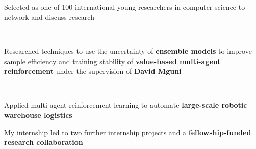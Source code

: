 \documentclass[]{lukas-cv-openfont}
\begin{document}

\noindent
{}
\\
\tinysectionsep

\noindent
{}
\\
\begin{tightitemize}{1.7em}
    \item Selected as one of 100 international young researchers in computer science to network and discuss research
\end{tightitemize}
\sectionsep

\noindent
{}
\\
\begin{tightitemize}{1.7em}
    \item Researched techniques to use the uncertainty of \textbf{ensemble models} to improve sample efficiency and training stability of \textbf{value-based multi-agent reinforcement} under the supervision of \textbf{David Mguni}
\end{tightitemize}
\sectionsep

\noindent
{}
\\
\begin{tightitemize}{1.7em}
\item Applied multi-agent reinforcement learning to automate \textbf{large-scale robotic warehouse logistics}
\item My internship led to two further internship projects and a \textbf{fellowship-funded research collaboration}
\end{tightitemize}
\sectionsep
\end{document}
